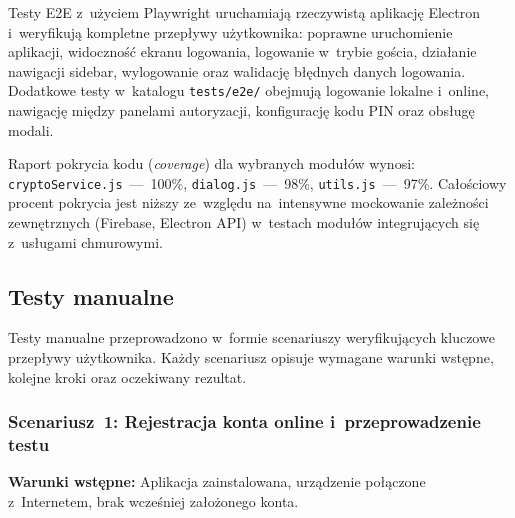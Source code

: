 \documentclass[12pt, a4paper, oneside]{report}
\begin{document}
Testy E2E z~użyciem Playwright uruchamiają rzeczywistą aplikację Electron
i~weryfikują kompletne przepływy użytkownika: poprawne uruchomienie aplikacji,
widoczność ekranu logowania, logowanie w~trybie gościa, działanie nawigacji
sidebar, wylogowanie oraz walidację błędnych danych logowania.
Dodatkowe testy w~katalogu \texttt{tests/e2e/} obejmują logowanie lokalne
i~online, nawigację między panelami autoryzacji, konfigurację kodu PIN
oraz obsługę modali.

Raport pokrycia kodu (\textit{coverage}) dla wybranych modułów wynosi:
\texttt{cryptoService.js}~---~100\%, \texttt{dialog.js}~---~98\%,
\texttt{utils.js}~---~97\%. Całościowy procent pokrycia jest niższy ze~względu
na~intensywne mockowanie zależności zewnętrznych (Firebase, Electron API)
w~testach modułów integrujących się z~usługami chmurowymi.

\subsection{Testy manualne}
\label{subsec:testy-manualne}

Testy manualne przeprowadzono w~formie scenariuszy weryfikujących kluczowe przepływy użytkownika.
Każdy scenariusz opisuje wymagane warunki wstępne, kolejne kroki oraz oczekiwany rezultat.

\subsubsection*{Scenariusz~1: Rejestracja konta online i~przeprowadzenie testu}
\label{scen:1}

\textbf{Warunki wstępne:} Aplikacja zainstalowana, urządzenie połączone z~Internetem,
brak wcześniej założonego konta.
\end{document}
